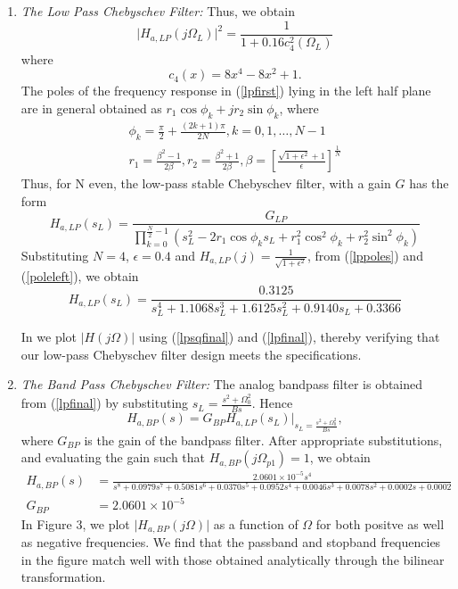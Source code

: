\documentclass[article]{IEEEtran}
\theoremstyle{remark}
\numberwithin{equation}{subsection}
\begin{document}
\begin{enumerate}
\item {\em The Low Pass Chebyschev Filter:} Thus, we obtain
\begin{equation}
\label{lpsqfinal}
\vert H_{a,LP}(j\Omega_L)\vert^2 = \frac{1}{1 + 0.16c_4^2(\Omega_L)}
\end{equation}
where
\begin{equation}
c_4(x) = 8x^4 - 8x^2 + 1.	
\end{equation}
The poles of the frequency response in (\ref{lpfirst}) lying in the left half plane are in general obtained as 
$r_1\cos\phi_k + jr_2\sin \phi_k$, where
\begin{eqnarray}
\label{lppoles}
\phi_k = \frac{\pi}{2} + \frac{(2k+1)\pi}{2N}, k = 0, 1, \dots, N-1 \nonumber \\
r_1 = \frac{\beta^2 - 1}{2\beta}, r_2 = \frac{\beta^2 + 1}{2\beta}, \beta = \left[ \frac{\sqrt{1 + \epsilon^2} + 1}{\epsilon}\right]^{\frac{1}{N}}
\end{eqnarray}
Thus, for N even, the low-pass stable Chebyschev filter, with a gain $G$ has the form
\begin{equation}
\label{poleleft}
H_{a,LP}(s_L) = \frac{G_{LP}}{\prod_{k = 0}^{\frac{N}{2}-1}(s_L^2 - 2r_1\cos\phi_ks_L + r_1^2\cos^2\phi_k + r_2^2 \sin^2\phi_k)}
\end{equation}
Substituting $N = 4$, $\epsilon = 0.4$ and $H_{a,LP}(j) = \frac{1}{\sqrt{1+\epsilon^2}}$, from (\ref{lppoles}) and (\ref{poleleft}), we obtain 
\begin{equation}
\label{lpfinal}
H_{a,LP}(s_L) = \frac{0.3125}{s_L^4 + 1.1068s_L^3 + 1.6125s_L^2+0.9140s_L + 0.3366}
\end{equation}

In  we plot $|H(j\Omega)|$ using (\ref{lpsqfinal}) and (\ref{lpfinal}), thereby verifying that our low-pass Chebyschev filter design meets the specifications.
\item {\em The Band Pass Chebyschev Filter:}  The analog bandpass filter is obtained from (\ref{lpfinal}) by substituting
$s_L = \frac{s^2 + \Omega_0^2}{Bs}$.  Hence
\begin{equation}
H_{a,BP}(s) = G_{BP}H_{a,LP}(s_L)\vert_{s_L = \frac{s^2 + \Omega_0^2}{Bs}},
\end{equation}
where $G_{BP}$ is the gain of the bandpass filter.  After appropriate substitutions, and evaluating the gain 
such that $H_{a,BP}(j\Omega_{p1}) = 1$, we obtain
{\tiny
\begin{align}
\label{bpfinal}
H_{a,BP}(s) &= \frac{2.0601\times 10^{-5}s^4}{s^8+0.0979s^7+0.5081s^6+0.0370s^5+0.0952s^4+0.0046s^3+0.0078s^2+0.0002s+0.0002}\\
G_{BP} & = 2.0601\times 10^{-5}
\end{align}
}
In Figure 3, we plot $\vert H_{a,BP}(j\Omega)\vert$ as a function of $\Omega$ for both positve as
well as negative frequencies.  We find that the passband and stopband frequencies in the figure
match well with those obtained analytically through the bilinear transformation.
\end{enumerate}
\end{document}
